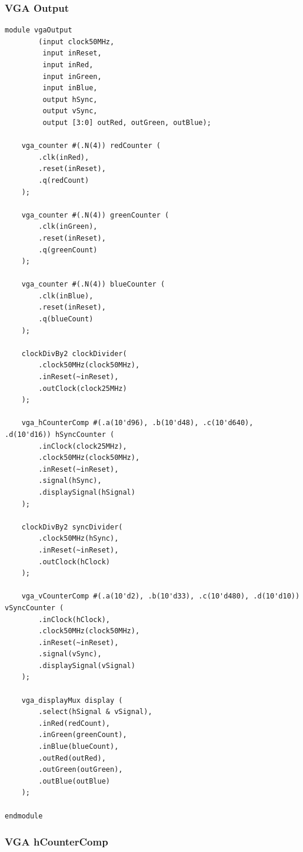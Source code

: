 \documentclass[a4paper]{article}
\begin{document}
\subsubsection{VGA Output}

\begin{Verbatim}
module vgaOutput
		(input clock50MHz,
		 input inReset,
		 input inRed,
		 input inGreen,
		 input inBlue,
		 output hSync,
		 output vSync,
		 output [3:0] outRed, outGreen, outBlue);
	
	vga_counter #(.N(4)) redCounter (
		.clk(inRed),
		.reset(inReset),
		.q(redCount)
	);
	
	vga_counter #(.N(4)) greenCounter (
		.clk(inGreen),
		.reset(inReset),
		.q(greenCount)
	);
	
	vga_counter #(.N(4)) blueCounter (
		.clk(inBlue),
		.reset(inReset),
		.q(blueCount)
	);

	clockDivBy2 clockDivider(
		.clock50MHz(clock50MHz),
		.inReset(~inReset),
		.outClock(clock25MHz)
	);
	
	vga_hCounterComp #(.a(10'd96), .b(10'd48), .c(10'd640), .d(10'd16)) hSyncCounter (
		.inClock(clock25MHz),
		.clock50MHz(clock50MHz),
		.inReset(~inReset),
		.signal(hSync),
		.displaySignal(hSignal)
	);
	
	clockDivBy2 syncDivider(
		.clock50MHz(hSync),
		.inReset(~inReset),
		.outClock(hClock)
	); 
	
	vga_vCounterComp #(.a(10'd2), .b(10'd33), .c(10'd480), .d(10'd10)) vSyncCounter (
		.inClock(hClock),
		.clock50MHz(clock50MHz),
		.inReset(~inReset),
		.signal(vSync),
		.displaySignal(vSignal)
	);
	
	vga_displayMux display (
		.select(hSignal & vSignal),
		.inRed(redCount),
		.inGreen(greenCount),
		.inBlue(blueCount),
		.outRed(outRed),
		.outGreen(outGreen),
		.outBlue(outBlue)
	);

endmodule
\end{Verbatim}

\subsubsection{VGA hCounterComp}
\end{document}
